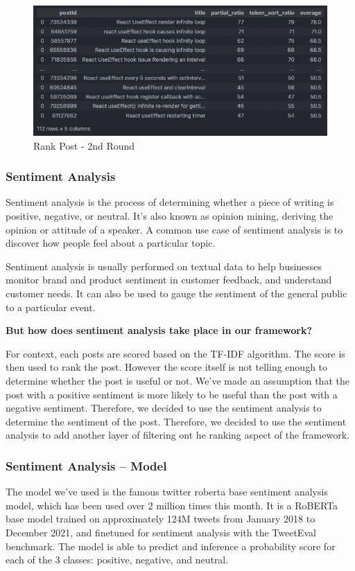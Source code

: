 \begin{figure}[H]
  \noindent \includegraphics[scale=0.65]{assets/fuzzy-wuzzy-query-1-results.png}
\caption{Rank Post - 2nd Round}\label{rank_post_2nd_round}
\end{figure}

\pagebreak
\subsubsection{Sentiment Analysis}
Sentiment analysis is the process of determining whether a piece of writing is positive, negative, or neutral. It's also known as opinion mining, deriving the opinion or attitude of a speaker. A common use case of sentiment analysis is to discover how people feel about a particular topic.

Sentiment analysis is usually performed on textual data to help businesses monitor brand and product sentiment in customer feedback, and understand customer needs. It can also be used to gauge the sentiment of the general public to a particular event.

\textbf{But how does sentiment analysis take place in our framework? }

For context, each posts are scored based on the TF-IDF algorithm. The score is then used to rank the post. However the score itself is not telling enough to determine whether the post is useful or not. We've made an assumption that the post with a positive sentiment is more likely to be useful than the post with a negative sentiment. Therefore, we decided to use the sentiment analysis to determine the sentiment of the post. Therefore, we decided to use the sentiment analysis to add another layer of filtering ont he ranking aspect of the framework.

\subsubsection{Sentiment Analysis -- Model}
The model we've used is the famous twitter roberta base sentiment analysis model, which has been used over 2 million times this month. It is a RoBERTa base model trained on approximately 124M tweets from January 2018 to December 2021, and finetuned for sentiment analysis with the TweetEval benchmark. The model is able to predict and inference a probability score for each of the 3 classes: positive, negative, and neutral. 

